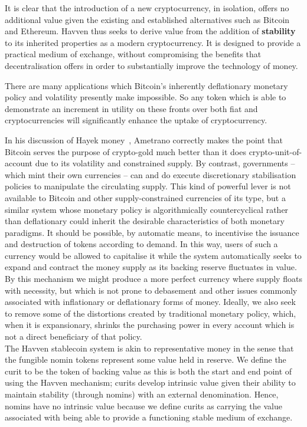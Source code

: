 It is clear that the introduction of a new cryptocurrency, in isolation, offers no additional value given
the existing and established alternatives such as Bitcoin and Ethereum. Havven thus seeks to derive value
from the addition of \textbf{stability} to its inherited properties as a modern cryptocurrency.
It is designed to provide a practical medium of exchange, without compromising the benefits that decentralisation
offers in order to substantially improve the technology of money.

There are many applications which Bitcoin's inherently deflationary monetary policy and
volatility presently make impossible. So any token which is able to demonstrate an increment
in utility on these fronts over both fiat and cryptocurrencies will significantly
enhance the uptake of cryptocurrency.

\noindent  In his discussion of Hayek money~\cite{ametrano2016hayek}, Ametrano correctly makes the point that
Bitcoin serves the purpose of crypto-gold much better than it does crypto-unit-of-account due to its volatility
and constrained supply. By contrast, governments -- which mint their own currencies -- can and do execute
discretionary stabilisation policies to manipulate the circulating supply. This kind of powerful lever is not
available to Bitcoin and other supply-constrained currencies of its type, but a similar system whose monetary
policy is algorithmically countercyclical rather than deflationary could inherit the desirable characteristics
of both monetary paradigms. It should be possible, by automatic means, to incentivise the issuance and
destruction of tokens according to demand. In this way, users of such a currency would be allowed to
capitalise it while the system automatically seeks to expand and contract the money supply as its backing
reserve fluctuates in value. By this mechanism we might produce a more perfect currency where supply floats
with necessity, but which is not prone to debasement and other issues commonly associated with
inflationary or deflationary forms of money. Ideally, we also seek to remove some of the distortions created
by traditional monetary policy, which, when it is expansionary, shrinks the purchasing power in every account
which is not a direct beneficiary of that policy.\\

\noindent The Havven stablecoin system is akin to representative money in the sense that the fungible nomin
tokens represent some value held in reserve. We define the curit to be the token of backing value as this is
both the start and end point of using the Havven mechanism; curits develop intrinsic value given their ability
to maintain stability (through nomins) with an external denomination. Hence, nomins have no intrinsic value
because we define curits as carrying the value associated with being able to provide a functioning stable
medium of exchange. \\

